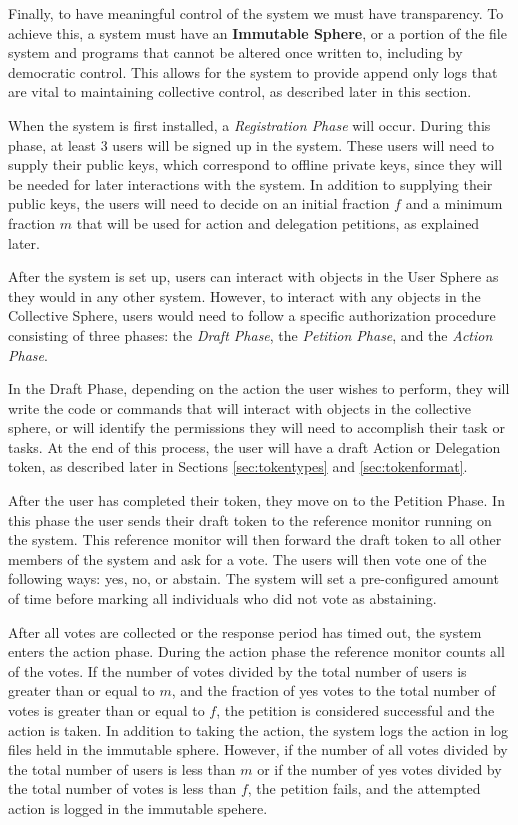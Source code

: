 Finally, to have meaningful control of the system we must have transparency. To
achieve this, a system must have an \textbf{Immutable Sphere}, or a portion of
the file system and programs that cannot be altered once written to, including
by democratic control. This allows for the system to provide append only logs
that are vital to maintaining collective control, as described later in this
section.

When the system is first installed, a \textit{Registration Phase} will occur.
During this phase, at least 3 users will be signed up in the system. These users
will need to supply their public keys, which correspond to offline private keys,
since they will be needed for later interactions with the system. In addition to
supplying their public keys, the users will need to decide on an initial
fraction $f$ and a minimum fraction $m$ that will be used for action and
delegation petitions, as explained later.

After the system is set up, users can interact with objects in the User Sphere
as they would in any other system. However, to interact with any objects in the
Collective Sphere, users would need to follow a specific authorization
procedure consisting of three phases: the \textit{Draft Phase}, the 
\textit{Petition Phase}, and the \textit{Action Phase}.

In the Draft Phase, depending on the action the user wishes to perform, they
will write the code or commands that will interact with objects in the
collective sphere, or will identify the permissions they will need to accomplish
their task or tasks. At the end of this process, the user will have a draft
Action or Delegation token, as described later in Sections \ref{sec:tokentypes}
and \ref{sec:tokenformat}.

After the user has completed their token, they move on to the Petition Phase. In
this phase the user sends their draft token to the reference monitor running on
the system. This reference monitor will then forward the draft token to all
other members of the system and ask for a vote. The users will then vote one of
the following ways: yes, no, or abstain. The system will set a pre-configured
amount of time before marking all individuals who did not vote as abstaining.

After all votes are collected or the response period has timed out, the system
enters the action phase. During the action phase the reference monitor counts
all of the votes. If the number of votes divided by the total number of users is
greater than or equal to $m$, and the fraction of yes votes to the total number
of votes is greater than or equal to $f$, the petition is considered successful
and the action is taken. In addition to taking the action, the system logs the
action in log files held in the immutable sphere. However, if the number of all
votes divided by the total number of users is less than $m$ or if the number of
yes votes divided by the total number of votes is less than $f$, the petition
fails, and the attempted action is logged in the immutable spehere.


